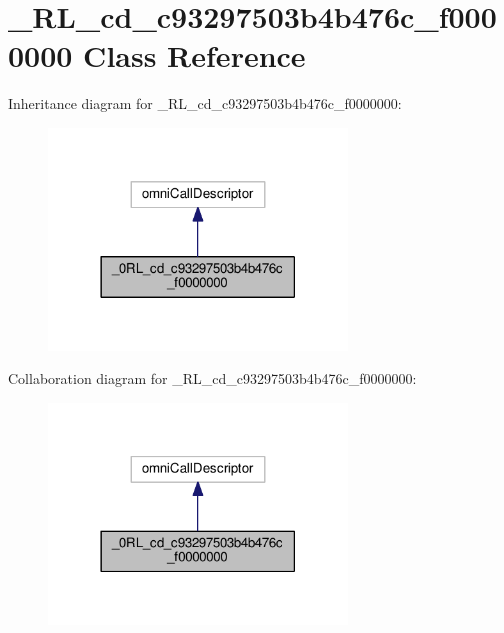 \hypertarget{class__0_r_l__cd__c93297503b4b476c__f0000000}{}\section{\+\_\+R\+L\+\_\+cd\+\_\+c93297503b4b476c\+\_\+f0000000 Class Reference}
\label{class__0_r_l__cd__c93297503b4b476c__f0000000}


Inheritance diagram for \+\_\+R\+L\+\_\+cd\+\_\+c93297503b4b476c\+\_\+f0000000\+:
\nopagebreak
\begin{figure}[H]
\begin{center}
\leavevmode
\includegraphics[width=225pt]{class__0_r_l__cd__c93297503b4b476c__f0000000__inherit__graph}
\end{center}
\end{figure}


Collaboration diagram for \+\_\+R\+L\+\_\+cd\+\_\+c93297503b4b476c\+\_\+f0000000\+:
\nopagebreak
\begin{figure}[H]
\begin{center}
\leavevmode
\includegraphics[width=225pt]{class__0_r_l__cd__c93297503b4b476c__f0000000__coll__graph}
\end{center}
\end{figure}
